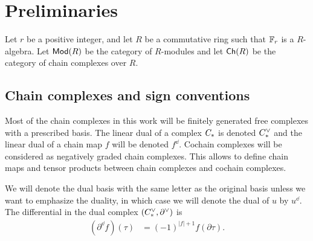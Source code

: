 
\section{Preliminaries}\label{s:preliminaries}

Let $r$ be a positive integer, and let $R$ be a commutative ring such that $\mathbb{F}_r$ is a $R$-algebra.
Let $\mathsf{Mod}(R)$ be the category of $R$-modules and let $\mathsf{Ch}(R)$ be the category of chain complexes over $R$.

\subsection{Chain complexes and sign conventions}

Most of the chain complexes in this work will be finitely generated free complexes with a prescribed basis. The linear dual of a complex $C_{*}$ is denoted $C^\vee_{*}$ and the linear dual of a chain map $f$ will be denoted $f^\dd$. Cochain complexes will be considered as negatively graded chain complexes. This allows to define chain maps and tensor products between chain complexes and cochain complexes.

We will denote the dual basis with the same letter as the original basis unless we want to emphasize the duality, in which case we will denote the dual of $u$ by $u^\dd$. The differential in the dual complex $(C^\vee_{*},\partial^\vee)$ is
\begin{align*}
	(\partial^\dd f)(\tau) &= (-1)^{|f|+1} f(\partial \tau). 
\end{align*}

